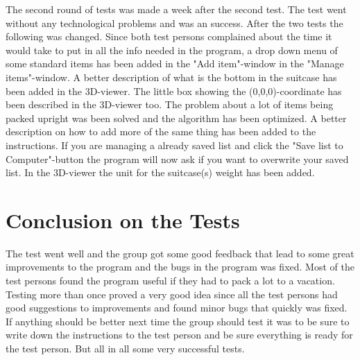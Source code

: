 The second round of tests was made a week after the second test. The test went without any technological problems and was an success. After the two tests the following was changed. Since both test persons complained about the time it would take to put in all the info needed in the program, a drop down menu of some standard items has been added in the "Add item"-window in the "Manage items"-window. A better description of what is the bottom in the suitcase has been added in the 3D-viewer. The little box showing the (0,0,0)-coordinate has been described in the 3D-viewer too. The problem about a lot of items being packed upright was been solved and the algorithm has been optimized. A better description on how to add more of the same thing has been added to the instructions. If you are managing a already saved list and click the "Save list to Computer"-button the program will now ask if you want to overwrite your saved list. In the 3D-viewer the unit for the suitcase(s) weight has been added. 

\section{Conclusion on the Tests}
The test went well and the group got some good feedback that lead to some great improvements to the program and the bugs in the program was fixed. Most of the test persons found the program useful if they had to pack a lot to a vacation. Testing more than once proved a very good idea since all the test persons had good suggestions to improvements and found minor bugs that quickly was fixed. If anything should be better next time the group should test it was to be sure to write down the instructions to the test person and be sure everything is ready for the test person. But all in all some very successful tests.



